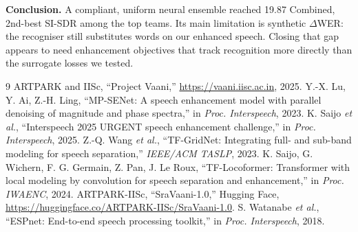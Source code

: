 \documentclass[conference]{IEEEtran}
\begin{document}
\textbf{Conclusion.} A compliant, uniform neural ensemble reached 19.87 Combined, 2nd-best SI-SDR among the top
teams. Its main limitation is synthetic $\Delta$WER: the recogniser still substitutes words on our enhanced
speech. Closing that gap appears to need enhancement objectives that track recognition more directly than the
surrogate losses we tested.

\begin{thebibliography}{9}
 ARTPARK and IISc, ``Project Vaani,'' \url{https://vaani.iisc.ac.in}, 2025.
 Y.-X. Lu, Y. Ai, Z.-H. Ling, ``MP-SENet: A speech enhancement model with parallel denoising of
magnitude and phase spectra,'' in \emph{Proc. Interspeech}, 2023.
 K. Saijo \emph{et al.}, ``Interspeech 2025 URGENT speech enhancement challenge,'' in
\emph{Proc. Interspeech}, 2025.
 Z.-Q. Wang \emph{et al.}, ``TF-GridNet: Integrating full- and sub-band modeling for speech
separation,'' \emph{IEEE/ACM TASLP}, 2023.
 K. Saijo, G. Wichern, F. G. Germain, Z. Pan, J. Le Roux, ``TF-Locoformer: Transformer with
local modeling by convolution for speech separation and enhancement,'' in \emph{Proc. IWAENC}, 2024.
 ARTPARK-IISc, ``SraVaani-1.0,'' Hugging Face, \url{https://huggingface.co/ARTPARK-IISc/SraVaani-1.0}.
 S. Watanabe \emph{et al.}, ``ESPnet: End-to-end speech processing toolkit,'' in \emph{Proc.
Interspeech}, 2018.
\end{thebibliography}
\end{document}
